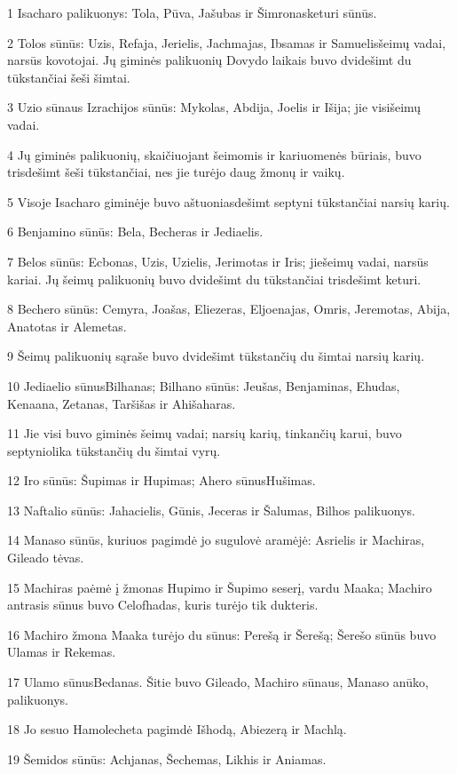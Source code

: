 \par 1 Isacharo palikuonys: Tola, Pūva, Jašubas ir Šimronas­keturi sūnūs. 
\par 2 Tolos sūnūs: Uzis, Refaja, Jerielis, Jachmajas, Ibsamas ir Samuelis­šeimų vadai, narsūs kovotojai. Jų giminės palikuonių Dovydo laikais buvo dvidešimt du tūkstančiai šeši šimtai. 
\par 3 Uzio sūnaus Izrachijos sūnūs: Mykolas, Abdija, Joelis ir Išija; jie visi­šeimų vadai. 
\par 4 Jų giminės palikuonių, skaičiuojant šeimomis ir kariuomenės būriais, buvo trisdešimt šeši tūkstančiai, nes jie turėjo daug žmonų ir vaikų. 
\par 5 Visoje Isacharo giminėje buvo aštuoniasdešimt septyni tūkstančiai narsių karių. 
\par 6 Benjamino sūnūs: Bela, Becheras ir Jediaelis. 
\par 7 Belos sūnūs: Ecbonas, Uzis, Uzielis, Jerimotas ir Iris; jie­šeimų vadai, narsūs kariai. Jų šeimų palikuonių buvo dvidešimt du tūkstančiai trisdešimt keturi. 
\par 8 Bechero sūnūs: Cemyra, Joašas, Eliezeras, Eljoenajas, Omris, Jeremotas, Abija, Anatotas ir Alemetas. 
\par 9 Šeimų palikuonių sąraše buvo dvidešimt tūkstančių du šimtai narsių karių. 
\par 10 Jediaelio sūnus­Bilhanas; Bilhano sūnūs: Jeušas, Benjaminas, Ehudas, Kenaana, Zetanas, Taršišas ir Ahišaharas. 
\par 11 Jie visi buvo giminės šeimų vadai; narsių karių, tinkančių karui, buvo septyniolika tūkstančių du šimtai vyrų. 
\par 12 Iro sūnūs: Šupimas ir Hupimas; Ahero sūnus­Hušimas. 
\par 13 Naftalio sūnūs: Jahacielis, Gūnis, Jeceras ir Šalumas, Bilhos palikuonys. 
\par 14 Manaso sūnūs, kuriuos pagimdė jo sugulovė aramėjė: Asrielis ir Machiras, Gileado tėvas. 
\par 15 Machiras paėmė į žmonas Hupimo ir Šupimo seserį, vardu Maaka; Machiro antrasis sūnus buvo Celofhadas, kuris turėjo tik dukteris. 
\par 16 Machiro žmona Maaka turėjo du sūnus: Perešą ir Šerešą; Šerešo sūnūs buvo Ulamas ir Rekemas. 
\par 17 Ulamo sūnus­Bedanas. Šitie buvo Gileado, Machiro sūnaus, Manaso anūko, palikuonys. 
\par 18 Jo sesuo Hamolecheta pagimdė Išhodą, Abiezerą ir Machlą. 
\par 19 Šemidos sūnūs: Achjanas, Šechemas, Likhis ir Aniamas. 
